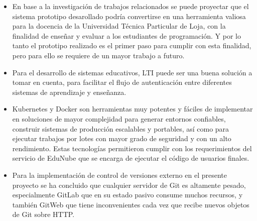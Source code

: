 \begin{itemize}
  \item En base a la investigación de trabajos relacionados se puede proyectar que el sistema prototipo desarollado podría convertirse en una herramienta valiosa para la docencia de la Universidad Técnica Particular de Loja, con la finalidad de enseñar y evaluar a los estudiantes de programación. Y por lo tanto el prototipo realizado es el primer paso para cumplir con esta finalidad, pero para ello se requiere de un mayor trabajo a futuro.
  \item Para el desarrollo de sistemas educativos, LTI puede ser una buena solución a tomar en cuenta, para facilitar el flujo de autenticación entre diferentes sistemas de aprendizaje y enseñanza.
  \item Kubernetes y Docker son herramientas muy potentes y fáciles de implementar en soluciones de mayor complejidad para generar entornos confiables, construir sistemas de producción escalables y portables, así como para ejecutar trabajos por lotes con mayor grado de seguridad y con un alto rendimiento. Estas tecnologías permitieron cumplir con los requerimientos del servicio de EduNube que se encarga de ejecutar el código de usuarios finales.
  \item Para la implementación de control de versiones externo en el presente proyecto se ha concluido que cualquier servidor de Git es altamente pesado, especialmente GitLab que en su estado pasivo consume muchos recursos, y también GitWeb que tiene inconvenientes cada vez que recibe nuevos objetos de Git sobre HTTP.

\end{itemize}
